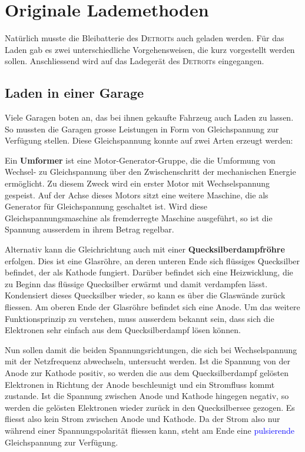 \section{Originale Lademethoden}

Natürlich musste die Bleibatterie des \textsc{Detroit}s auch geladen werden. Für das Laden gab es zwei unterschiedliche Vorgehensweisen, die kurz vorgestellt werden sollen. Anschliessend wird auf das Ladegerät des \textsc{Detroit}s eingegangen.

\subsection{Laden in einer Garage} \label{Laden_in_Garage}
Viele Garagen boten an, das bei ihnen gekaufte Fahrzeug auch Laden zu lassen. So mussten die Garagen grosse Leistungen in Form von Gleichspannung zur Verfügung stellen. Diese Gleichspannung konnte auf zwei Arten erzeugt werden:

Ein \textbf{Umformer} ist eine Motor-Generator-Gruppe, die die Umformung von Wechsel- zu Gleichspannung über den Zwischenschritt der mechanischen Energie ermöglicht. Zu diesem Zweck wird ein erster Motor mit Wechselspannung gespeist. Auf der Achse dieses Motors sitzt eine weitere Maschine, die als Generator für Gleichspannung geschaltet ist. Wird diese Gleichspannungsmaschine als fremderregte Maschine ausgeführt, so ist die Spannung ausserdem in ihrem Betrag regelbar.

Alternativ kann die Gleichrichtung auch mit einer \textbf{Quecksilberdampfröhre} erfolgen. Dies ist eine Glasröhre, an deren unteren Ende sich flüssiges Quecksilber befindet, der als Kathode fungiert. Darüber befindet sich eine Heizwicklung, die zu Beginn das flüssige Quecksilber erwärmt und damit verdampfen lässt. Kondensiert dieses Quecksilber wieder, so kann es über die Glaswände zurück fliessen. Am oberen Ende der Glasröhre befindet sich eine Anode. Um das weitere Funktionsprinzip zu verstehen, muss ausserdem bekannt sein, dass sich die Elektronen sehr einfach aus dem Quecksilberdampf lösen können.

Nun sollen damit die beiden Spannungsrichtungen, die sich bei Wechselspannung mit der Netzfrequenz abwechseln, untersucht werden. Ist die Spannung von der Anode zur Kathode positiv, so werden die aus dem Quecksilberdampf gelösten Elektronen in Richtung der Anode beschleunigt und ein Stromfluss kommt zustande. Ist die Spannung zwischen Anode und Kathode hingegen negativ, so werden die gelösten Elektronen wieder zurück in den Quecksilbersee gezogen. Es fliesst also kein Strom zwischen Anode und Kathode. Da der Strom also nur während einer Spannungspolarität fliessen kann, steht am Ende eine \textcolor{blue}{pulsierende} Gleichspannung zur Verfügung.

